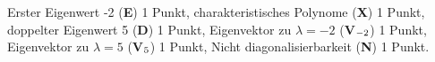 \begin{bewertung}
Erster Eigenwert -2 ({\bf E}) 1 Punkt,
charakteristisches Polynome ({\bf X}) 1 Punkt,
doppelter Eigenwert 5 ({\bf D}) 1 Punkt,
Eigenvektor zu $\lambda=-2$ ({\bf V$\mathstrut_{-2}$}) 1 Punkt,
Eigenvektor zu $\lambda=5$ ({\bf V$\mathstrut_5$}) 1 Punkt,
Nicht diagonalisierbarkeit ({\bf N}) 1 Punkt.
\end{bewertung}
